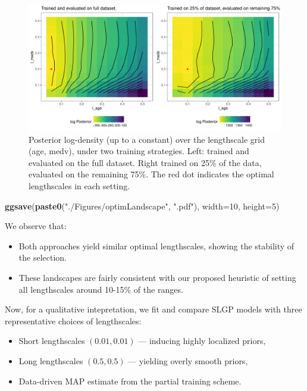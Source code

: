 \documentclass[
]{article}
\newenvironment{Shaded}{\begin{snugshade}}{\end{snugshade}}
\newcommand{\AttributeTok}[1]{\textcolor[rgb]{0.13,0.29,0.53}{#1}}
\newcommand{\DecValTok}[1]{\textcolor[rgb]{0.00,0.00,0.81}{#1}}
\newcommand{\FunctionTok}[1]{\textcolor[rgb]{0.13,0.29,0.53}{\textbf{#1}}}
\newcommand{\NormalTok}[1]{#1}
\newcommand{\StringTok}[1]{\textcolor[rgb]{0.31,0.60,0.02}{#1}}
\begin{document}
\begin{figure}[H]

{\centering \includegraphics{IntroductionSLGP_files/figure-latex/optimlandscape-1} 

}

\caption{Posterior log-density (up to a constant) over the lengthscale grid (age, medv), under two training strategies. Left: trained and evaluated on the full dataset. Right trained on 25\% of the data, evaluated on the remaining 75\%. The red dot indicates the optimal lengthscales in each setting.}\label{fig:optimlandscape}
\end{figure}

\begin{Shaded}
\begin{Highlighting}[]
\FunctionTok{ggsave}\NormalTok{(}\FunctionTok{paste0}\NormalTok{(}\StringTok{"./Figures/optimLandscape"}\NormalTok{,  }\StringTok{".pdf"}\NormalTok{), }\AttributeTok{width=}\DecValTok{10}\NormalTok{, }\AttributeTok{height=}\DecValTok{5}\NormalTok{)}
\end{Highlighting}
\end{Shaded}

We observe that:

\begin{itemize}
\item
  Both approaches yield similar optimal lengthscales, showing the stability of the selection.
\item
  These landscapes are fairly consistent with our proposed heuristic of setting all lengthscales around 10-15\% of the ranges.
\end{itemize}

Now, for a qualitative intepretation, we fit and compare SLGP models with three representative choices of lengthscales:

\begin{itemize}
\item
  Short lengthscales \((0.01, 0.01)\) --- inducing highly localized priors,
\item
  Long lengthscales \((0.5, 0.5)\) --- yielding overly smooth priors,
\item
  Data-driven MAP estimate from the partial training scheme.
\end{itemize}
\end{document}
